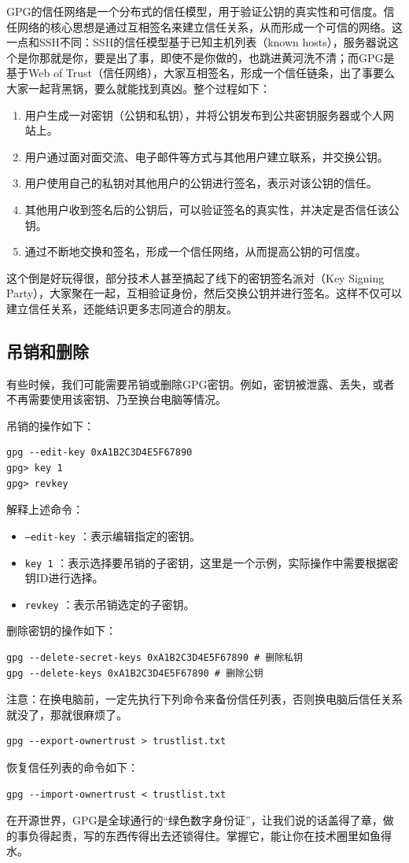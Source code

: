 GPG的信任网络是一个分布式的信任模型，用于验证公钥的真实性和可信度。信任网络的核心思想是通过互相签名来建立信任关系，从而形成一个可信的网络。这一点和SSH不同：SSH的信任模型基于已知主机列表（known hosts），服务器说这个是你那就是你，要是出了事，即使不是你做的，也跳进黄河洗不清；而GPG是基于Web of Trust（信任网络），大家互相签名，形成一个信任链条，出了事要么大家一起背黑锅，要么就能找到真凶。整个过程如下：
\begin{enumerate}
  \item 用户生成一对密钥（公钥和私钥），并将公钥发布到公共密钥服务器或个人网站上。
  \item 用户通过面对面交流、电子邮件等方式与其他用户建立联系，并交换公钥。
  \item 用户使用自己的私钥对其他用户的公钥进行签名，表示对该公钥的信任。
  \item 其他用户收到签名后的公钥后，可以验证签名的真实性，并决定是否信任该公钥。
  \item 通过不断地交换和签名，形成一个信任网络，从而提高公钥的可信度。
\end{enumerate}
这个倒是好玩得很，部分技术人甚至搞起了线下的密钥签名派对（Key Signing Party），大家聚在一起，互相验证身份，然后交换公钥并进行签名。这样不仅可以建立信任关系，还能结识更多志同道合的朋友。

\subsection{吊销和删除}

有些时候，我们可能需要吊销或删除GPG密钥。例如，密钥被泄露、丢失，或者不再需要使用该密钥、乃至换台电脑等情况。

吊销的操作如下：
\begin{verbatim}
gpg --edit-key 0xA1B2C3D4E5F67890
gpg> key 1
gpg> revkey
\end{verbatim}
解释上述命令：
\begin{itemize}
  \item  \texttt{--edit-key} ：表示编辑指定的密钥。
  \item  \texttt{key 1} ：表示选择要吊销的子密钥，这里是一个示例，实际操作中需要根据密钥ID进行选择。
  \item  \texttt{revkey} ：表示吊销选定的子密钥。
\end{itemize}

删除密钥的操作如下：
\begin{verbatim}
gpg --delete-secret-keys 0xA1B2C3D4E5F67890 # 删除私钥
gpg --delete-keys 0xA1B2C3D4E5F67890 # 删除公钥
\end{verbatim}

注意：在换电脑前，一定先执行下列命令来备份信任列表，否则换电脑后信任关系就没了，那就很麻烦了。
\begin{verbatim}
gpg --export-ownertrust > trustlist.txt
\end{verbatim}
恢复信任列表的命令如下：
\begin{verbatim}
gpg --import-ownertrust < trustlist.txt
\end{verbatim}

在开源世界，GPG是全球通行的“绿色数字身份证”，让我们说的话盖得了章，做的事负得起责，写的东西传得出去还锁得住。掌握它，能让你在技术圈里如鱼得水。